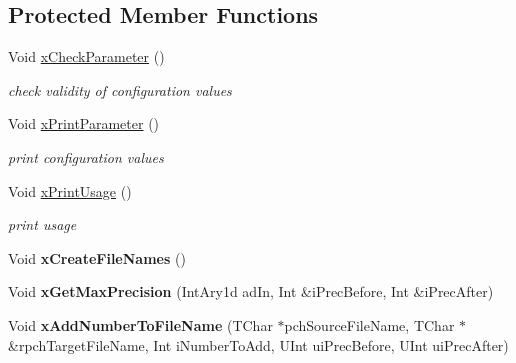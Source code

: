 \subsection*{Protected Member Functions}
\begin{DoxyCompactItemize}
\item 
Void \hyperlink{class_t_app_renderer_cfg_ae527491bfd779c691f53f9d498ca82f0}{x\+Check\+Parameter} ()
\begin{DoxyCompactList}\small\item\em check validity of configuration values \end{DoxyCompactList}\item 
\mbox{\label{class_t_app_renderer_cfg_a7fb014d40daf4e44b207febd96f7c7aa}} 
Void \hyperlink{class_t_app_renderer_cfg_a7fb014d40daf4e44b207febd96f7c7aa}{x\+Print\+Parameter} ()
\begin{DoxyCompactList}\small\item\em print configuration values \end{DoxyCompactList}\item 
\mbox{\label{class_t_app_renderer_cfg_acd88dfdea2798cdb695e371c3145abdd}} 
Void \hyperlink{class_t_app_renderer_cfg_acd88dfdea2798cdb695e371c3145abdd}{x\+Print\+Usage} ()
\begin{DoxyCompactList}\small\item\em print usage \end{DoxyCompactList}\item 
\mbox{\label{class_t_app_renderer_cfg_a8cf5ccf82936ed5b5b87478833c94b74}} 
Void {\bfseries x\+Create\+File\+Names} ()
\item 
\mbox{\label{class_t_app_renderer_cfg_ae004c61992b1f9f6beca698dc7468287}} 
Void {\bfseries x\+Get\+Max\+Precision} (Int\+Ary1d ad\+In, Int \&i\+Prec\+Before, Int \&i\+Prec\+After)
\item 
\mbox{\label{class_t_app_renderer_cfg_acb46929cde94802d1e01342c4f3cc056}} 
Void {\bfseries x\+Add\+Number\+To\+File\+Name} (T\+Char $\ast$pch\+Source\+File\+Name, T\+Char $\ast$\&rpch\+Target\+File\+Name, Int i\+Number\+To\+Add, U\+Int ui\+Prec\+Before, U\+Int ui\+Prec\+After)
\end{DoxyCompactItemize}
